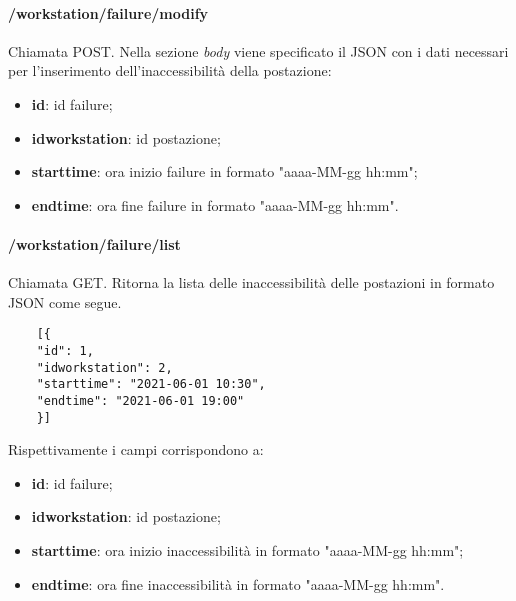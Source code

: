 \paragraph{/workstation/failure/modify}
Chiamata POST. Nella sezione \textit{body} viene specificato il JSON con i dati necessari per l'inserimento dell'inaccessibilità della postazione:
\begin{itemize}
	\item \textbf{id}: id failure;
	\item \textbf{idworkstation}: id postazione;
	\item \textbf{starttime}: ora inizio failure in formato "aaaa-MM-gg hh:mm";
	\item \textbf{endtime}: ora fine failure in formato "aaaa-MM-gg hh:mm".
\end{itemize}
\paragraph{/workstation/failure/list}
Chiamata GET. Ritorna la lista delle inaccessibilità delle postazioni in formato JSON come segue.	\\
\begin{center}
	\begin{lstlisting}
	[{
	"id": 1,
	"idworkstation": 2,
	"starttime": "2021-06-01 10:30",
	"endtime": "2021-06-01 19:00"
	}]
	\end{lstlisting}
\end{center}
Rispettivamente i campi corrispondono a:
\begin{itemize}
	\item \textbf{id}: id failure;
	\item \textbf{idworkstation}: id postazione;
	\item \textbf{starttime}: ora inizio inaccessibilità in formato "aaaa-MM-gg hh:mm";
	\item \textbf{endtime}: ora fine inaccessibilità in formato "aaaa-MM-gg hh:mm".
\end{itemize}

